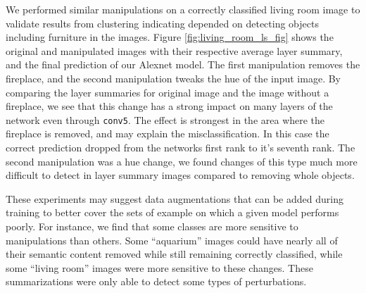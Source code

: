 We performed similar manipulations on a correctly classified living room image to validate results from clustering indicating depended on detecting objects including furniture in the images. Figure \ref{fig:living_room_ls_fig} shows the original and manipulated images with their respective average layer summary, and the final prediction of our Alexnet model. The first manipulation removes the fireplace, and the second manipulation tweaks the hue of the input image. By comparing the layer summaries for original image and the image without a fireplace, we see that this change has a strong impact on many layers of the network even through \texttt{conv5}. The effect is strongest in the area where the fireplace is removed, and may explain the misclassification. In this case the correct prediction dropped from the networks first rank to it's seventh rank. The second manipulation was a hue change, we found changes of this type much more difficult to detect in layer summary images compared to removing whole objects. 

These experiments may suggest data augmentations that can be added during training to better cover the sets of example on which a given model performs poorly. For instance, we find that some classes are more sensitive to manipulations than others. Some ``aquarium'' images could have nearly all of their semantic content removed while still remaining correctly classified, while some ``living room'' images were more sensitive to these changes. These summarizations were only able to detect some types of perturbations. 
